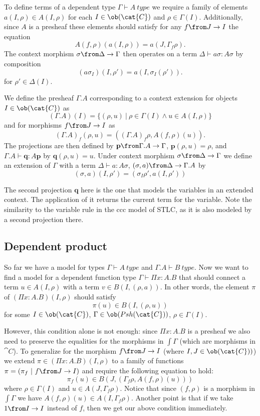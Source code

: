 To define terms of a dependent type $\Gamma \vdash A~type$ we require a family
of elements $a(I, \rho) \in A(I, \rho)$ for each $I \in \ob(\cat{C})$ and $\rho
\in \Gamma(I)$. Additionally, since $A$ is a presheaf these elements should
satisfy for any $f \from J \to I$ the equation
\[
  A(f, \rho)(a(I, \rho)) = a(J, \Gamma_f \rho).
\]
The context morphism $\sigma \from \Delta \to \Gamma$ then operates on a term
$\Delta \vdash a\sigma : A\sigma$ by composition
\[
  (a\sigma_I)(I, \rho') = a(I, \sigma_I(\rho')).
\]
for $\rho' \in \Delta(I)$.

We define the presheaf $\Gamma.A$ corresponding to a context extension for
objects $I \in \ob(\cat{C})$ as
\[
  (\Gamma.A)(I) = \{(\rho, u)~|~\rho \in \Gamma(I) \land u \in A(I, \rho)\}
\]
and for morphisms $f \from J \to I$ as
\[
  (\Gamma.A)_f(\rho, u) = ((\Gamma.A)_f \rho, A(f, \rho)(u)).
\]
The projections are then defined by $\mathbf{p} \from \Gamma.A \to \Gamma$,
$\mathbf{p}(\rho, u) = \rho$, and $\Gamma.A \vdash \mathbf{q} : A\mathbf{p}$ by
$\mathbf{q}(\rho, u) = u$. Under context morphism $\sigma \from \Delta \to
\Gamma$ we define an extension of $\Gamma$ with a term $\Delta \vdash a :
A\sigma$, $(\sigma, a) \from \Delta \to \Gamma.A$ by
\[
  (\sigma, a)(I, \rho') = (\sigma_I \rho', a(I, \rho'))
\]

The second projection $\mathbf{q}$ here is the one that models the variables in
an extended context. The application of it returns the current term for the
variable. Note the similarity to the variable rule in the ccc model of STLC, as
it is also modeled by a second projection there.

\subsection*{Dependent product}

So far we have a model for types $\Gamma \vdash A~type$ and $\Gamma.A \vdash
B~type$. Now we want to find a model for a dependent function type $\Gamma
\vdash \Pi x:A.B$ that should connect a term $u \in A(I, \rho)$ with a term $v
\in B(I, (\rho, a))$. In other words, the element $\pi$ of $(\Pi x:A.B)(I, \rho)$
should satisfy
\[
  \pi(u) \in B(I, (\rho, u))
\]
for some $I \in \ob(\cat{C})$, $\Gamma \in \ob(Psh(\cat{C}))$, $\rho \in
\Gamma(I)$.

However, this condition alone is not enough: since $\Pi x: A.B$ is a presheaf
we also need to preserve the equalities for the morphisms in $\int \Gamma$
(which are morphisms in $\cat{C}$). To generalize for the morphism $f \from J
\to I$ (where $I, J \in \ob(\cat{C}))$) we extend $\pi \in (\Pi x: A.B)(I,
\rho)$ to a family of functions $\pi = (\pi_f~|~f \from J \to I)$ and require
the following equation to hold:
\[
  \pi_f(u) \in B(J, (\Gamma_f \rho, A(f, \rho)(u)))
\]
where $\rho \in \Gamma(I)$ and $u \in A(J, \Gamma_f \rho)$. Notice that since
$(f, \rho)$ is a morphism in $\int \Gamma$ we have $A(f, \rho)(u) \in A(I,
\Gamma_f \rho)$. Another point is that if we take $1 \from I \to I$ instead of
$f$, then we get our above condition immediately.


